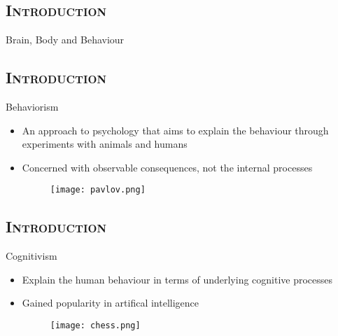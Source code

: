 \documentclass[xcolor=x11names,dvipsnames,compress]{beamer}
\renewcommand{\(}{\begin{columns}}
\renewcommand{\)}{\end{columns}}
\newcommand{\<}[1]{\begin{column}{#1}}
\renewcommand{\>}{\end{column}}
\begin{document}
\subsection{\scshape Introduction}
\begin{frame}[noframenumbering]
\Large Brain, Body and Behaviour
\end{frame}

\subsection{\scshape Introduction}
\begin{frame}{Behaviorism}
\begin{itemize}
 \item An approach to psychology that aims to explain the behaviour through experiments with animals and humans
 \item Concerned with observable consequences, not the internal processes
 \begin{figure}
\texttt{[image: pavlov.png]}  
 \end{figure}
\end{itemize}
\end{frame}

\subsection{\scshape Introduction}
\begin{frame}{Cognitivism}
\begin{itemize}
 \item Explain the human behaviour in terms of underlying cognitive processes
 \item Gained popularity in artifical intelligence
 \begin{figure}
\texttt{[image: chess.png]}  
 \end{figure}
\end{itemize}
\end{frame}

\end{document}
